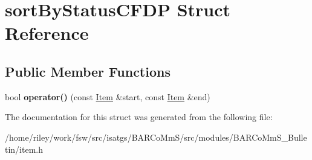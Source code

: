 \hypertarget{structsort_by_status_c_f_d_p}{}\section{sort\+By\+Status\+C\+F\+DP Struct Reference}
\label{structsort_by_status_c_f_d_p}
\subsection*{Public Member Functions}
\begin{DoxyCompactItemize}
\item 
bool {\bfseries operator()} (const \hyperlink{class_item}{Item} \&start, const \hyperlink{class_item}{Item} \&end)\hypertarget{structsort_by_status_c_f_d_p_a5afef599c86111f373c40bdf8fb9f236}{}\label{structsort_by_status_c_f_d_p_a5afef599c86111f373c40bdf8fb9f236}

\end{DoxyCompactItemize}


The documentation for this struct was generated from the following file\+:\begin{DoxyCompactItemize}
\item 
/home/riley/work/fsw/src/isatgs/\+B\+A\+R\+Co\+Mm\+S/src/modules/\+B\+A\+R\+Co\+Mm\+S\+\_\+\+Bulletin/item.\+h\end{DoxyCompactItemize}
